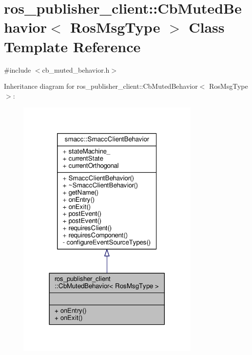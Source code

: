 \hypertarget{classros__publisher__client_1_1CbMutedBehavior}{}\section{ros\+\_\+publisher\+\_\+client\+:\+:Cb\+Muted\+Behavior$<$ Ros\+Msg\+Type $>$ Class Template Reference}
\label{classros__publisher__client_1_1CbMutedBehavior}


{\ttfamily \#include $<$cb\+\_\+muted\+\_\+behavior.\+h$>$}



Inheritance diagram for ros\+\_\+publisher\+\_\+client\+:\+:Cb\+Muted\+Behavior$<$ Ros\+Msg\+Type $>$\+:\nopagebreak
\begin{figure}[H]
\begin{center}
\leavevmode
\includegraphics[width=257pt]{classros__publisher__client_1_1CbMutedBehavior__inherit__graph}
\end{center}
\end{figure}



